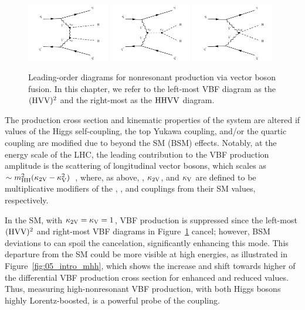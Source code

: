 \begin{figure}[htb]
    \centering
    \includegraphics[width=0.32\textwidth]{figures/05-HH/production/diagrams/feynman_04.pdf}
    \includegraphics[width=0.32\textwidth]{figures/05-HH/production/diagrams/feynman_05.pdf}
    \includegraphics[width=0.32\textwidth]{figures/05-HH/production/diagrams/feynman_03.pdf}
    \caption{Leading-order diagrams for nonresonant \HH production via vector boson fusion.
    In this chapter, we refer to the left-most VBF diagram as the $({\textrm{H}\textrm{V}\textrm{V}})^2$ and the right-most as the ${\textrm{H}\textrm{H}\textrm{V}\textrm{V}}$ diagram.}
    \label{fig:05_feynmanvbf}
\end{figure} 

The production cross section and kinematic properties of the \HH system are altered if values of the Higgs self-coupling, the top Yukawa coupling, and/or the quartic \HHVV coupling are modified due to beyond the SM (BSM) effects.
Notably, at the energy scale of the LHC, the leading contribution to the VBF production amplitude is the scattering of longitudinal vector bosons, which scales as $\sim m_{\textrm{H}\textrm{H}}^2 (\kappa_{2\textrm{V}} - \kappa_{\textrm{V}}^2)$~\cite{Bishara:2016kjn}, where, as above, \kapl, $\kappa_{2\textrm{V}}$, and $\kappa_{\textrm{V}}$ are defined to be multiplicative modifiers of the \HHH, \HHVV, and \HVV couplings from their SM values, respectively.

In the SM, with $\kappa_{2\textrm{V}} = \kappa_{\textrm{V}} = 1$, VBF production is suppressed since the left-most $({\textrm{H}\textrm{V}\textrm{V}})^2$ and right-most \HHVV VBF diagrams in Figure~\ref{fig:05_feynmanvbf} cancel; however, BSM deviations to \HHVV can spoil the cancelation, significantly enhancing this mode.
This departure from the SM could be more visible at high energies, as illustrated in Figure~\ref{fig:05_intro_mhh}, which shows the increase and shift towards higher \mHH of the differential VBF \HH production cross section for enhanced and reduced \kapvv values.
Thus, measuring high-\mHH nonresonant VBF \HH production, with both Higgs bosons highly Lorentz-boosted, is a powerful probe of the \HHVV coupling.

